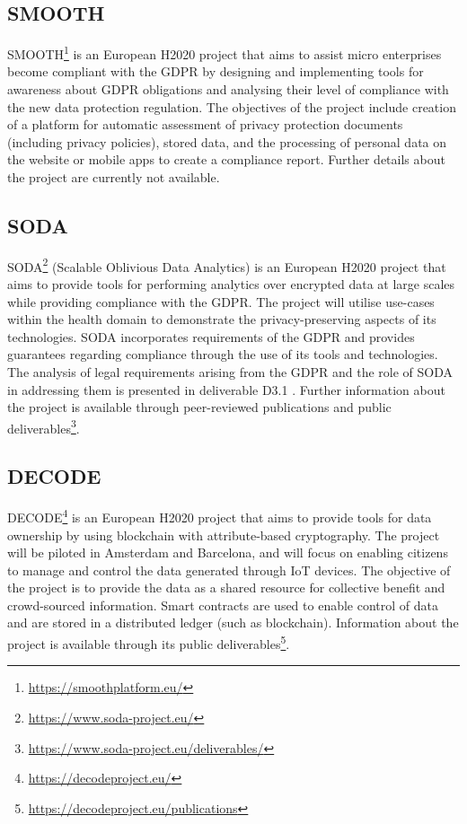 \subsection*{SMOOTH}
SMOOTH\footnote{\url{https://smoothplatform.eu/}} is an European H2020 project that aims to assist micro enterprises become compliant with the GDPR by designing and implementing tools for awareness about GDPR obligations and analysing their level of compliance with the new data protection regulation.
The objectives of the project include creation of a platform for automatic assessment of privacy protection documents (including privacy policies), stored data, and the processing of personal data on the website or mobile apps to create a compliance report. Further details about the project are currently not available.

\subsection*{SODA}
SODA\footnote{\url{https://www.soda-project.eu/}} (Scalable Oblivious Data Analytics) is an European H2020 project that aims to provide tools for performing analytics over encrypted data at large scales while providing compliance with the GDPR. The project will utilise use-cases within the health domain to demonstrate the privacy-preserving aspects of its technologies. SODA incorporates requirements of the GDPR and provides guarantees regarding compliance through the use of its tools and technologies. The analysis of legal requirements arising from the GDPR and the role of SODA in addressing them is presented in deliverable D3.1 \cite{spindler_d3.1_2017}. Further information about the project is available through peer-reviewed publications and public deliverables\footnote{\url{https://www.soda-project.eu/deliverables/}}.

\subsection*{DECODE}
DECODE\footnote{\url{https://decodeproject.eu/}} is an European H2020 project that aims to provide tools for data ownership by using blockchain with attribute-based cryptography. The project will be piloted in Amsterdam and Barcelona, and will focus on enabling citizens to manage and control the data generated through IoT devices. The objective of the project is to provide the data as a shared resource for collective benefit and crowd-sourced information. Smart contracts are used to enable control of data and are stored in a distributed ledger (such as blockchain). Information about the project is available through its public deliverables\footnote{\url{https://decodeproject.eu/publications}}.

